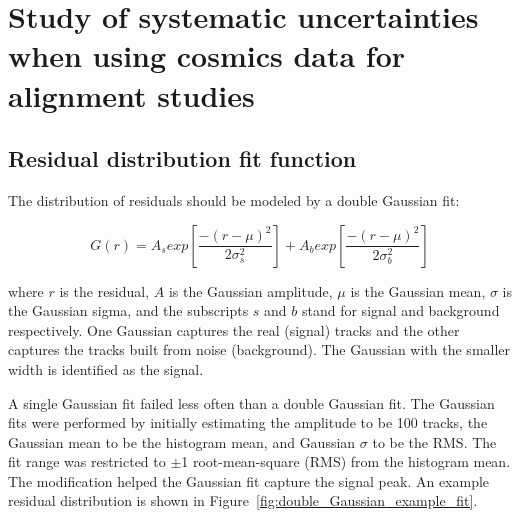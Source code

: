 

\chapter[Analysis systematics]{Study of systematic uncertainties when using cosmics data for alignment studies}
\label{appendix:systematics}


\section{Residual distribution fit function}
\label{appendix:systematics_res_fit_fcn}


The distribution of residuals should be modeled by a double Gaussian fit\cite{lefebvre_thesis}:

\begin{equation}
\label{eqn:doub_gaus}
G(r) = A_{s}exp\left[ \frac{-(r-\mu)^{2}}{2\sigma_s^{2}} \right] + A_{b}exp\left[ \frac{-(r-\mu)^{2}}{2\sigma_b^{2}} \right]
\end{equation}

where $r$ is the residual, $A$ is the Gaussian amplitude, $\mu$ is the Gaussian mean, $\sigma$ is the Gaussian sigma, and the subscripts $s$ and $b$ stand for signal and background respectively. One Gaussian captures the real (signal) tracks and the other captures the tracks built from noise (background). The Gaussian with the smaller width is identified as the signal. 

A single Gaussian fit failed less often than a double Gaussian fit. The Gaussian fits were performed by initially estimating the amplitude to be 100 tracks, the Gaussian mean to be the histogram mean, and Gaussian $\sigma$ to be the RMS. The fit range was restricted to $\pm$1 root-mean-square (RMS) from the histogram mean. The modification helped the Gaussian fit capture the signal peak. An example residual distribution is shown in Figure~\ref{fig:double_Gaussian_example_fit}. 

